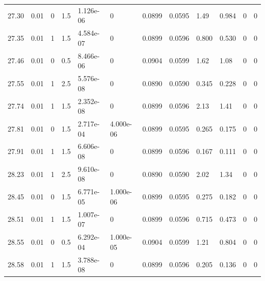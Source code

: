 \documentclass[preview]{standalone}
\begin{document}
{{{{{\begin{tabular}{L{1.2cm}C{1.2cm} C{0.3cm}C{0.5cm} C{1.4cm}C{1.4cm} C{1.4cm}C{1.4cm} C{1.6cm}C{1.6cm} C{1.6cm}C{1.6cm}}
  27.30  &  0.01  & 0     & 1.5 &  1.126e-06  & 0  &  0.0899&   0.0595& 1.49 & 0.984   &  0 & 0  \\ 
  27.35  &  0.01  & 1     & 1.5 &  4.584e-07  & 0  &  0.0899&   0.0596& 0.800 & 0.530   &  0 & 0  \\ 
  27.46  &  0.01  & 0     & 0.5 &  8.466e-06  & 0  &  0.0904&   0.0599& 1.62 & 1.08   &  0 & 0  \\ 
  27.55  &  0.01  & 1     & 2.5 &  5.576e-08  & 0  &  0.0890&   0.0590& 0.345 & 0.228   &  0 & 0  \\ 
  27.74  &  0.01  & 1     & 1.5 &  2.352e-08  & 0  &  0.0899&   0.0596& 2.13 & 1.41   &  0 & 0  \\ 
  27.81  &  0.01  & 0     & 1.5 &  2.717e-04  & 4.000e-06  &  0.0899&   0.0595& 0.265 & 0.175   &  0 & 0  \\ 
  27.91  &  0.01  & 1     & 1.5 &  6.606e-08  & 0  &  0.0899&   0.0596& 0.167 & 0.111   &  0 & 0  \\ 
  28.23  &  0.01  & 1     & 2.5 &  9.610e-08  & 0  &  0.0890&   0.0590& 2.02 & 1.34   &  0 & 0  \\ 
  28.45  &  0.01  & 0     & 1.5 &  6.771e-05  & 1.000e-06  &  0.0899&   0.0595& 0.275 & 0.182   &  0 & 0  \\ 
  28.51  &  0.01  & 1     & 1.5 &  1.007e-07  & 0  &  0.0899&   0.0596& 0.715 & 0.473   &  0 & 0  \\ 
  28.55  &  0.01  & 0     & 0.5 &  6.292e-04  & 1.000e-05  &  0.0904&   0.0599& 1.21 & 0.804   &  0 & 0  \\ 
  28.58  &  0.01  & 1     & 1.5 &  3.788e-08  & 0  &  0.0899&   0.0596& 0.205 & 0.136   &  0 & 0  \\ 
\hline 
\end{tabular} 

}}}}}
\end{document}
